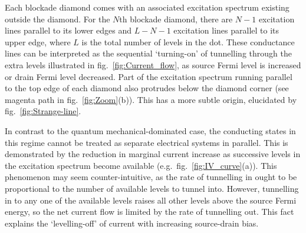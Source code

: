 \documentclass[a4paper,11pt]{article}
\begin{document}
    Each blockade diamond comes with an associated excitation spectrum existing outside the diamond. For the $N$th blockade diamond, there are $N-1$ excitation lines parallel to its lower edges and $L - N - 1$ excitation lines parallel to its upper edge, where $L$ is the total number of levels in the dot. These conductance lines can be interpreted as the sequential `turning-on' of tunnelling through the extra levels illustrated in fig.~\ref{fig:Current_flow}, as source Fermi level is increased or drain Fermi level decreased. Part of the excitation spectrum running parallel to the top edge of each diamond also protrudes below the diamond corner (see magenta path in fig.~\ref{fig:Zoom}(b)). This has a more subtle origin, elucidated by fig.~\ref{fig:Strange-line}.

    In contrast to the quantum mechanical-dominated case, the conducting states in this regime cannot be treated as separate electrical systems in parallel. This is demonstrated by the reduction in marginal current increase as successive levels in the excitation spectrum become available (e.g.\ fig.~\ref{fig:IV_curve}(a)). This phenomenon may seem counter-intuitive, as the rate of tunnelling in ought to be proportional to the number of available levels to tunnel into. However, tunnelling in to any one of the available levels raises all other levels above the source Fermi energy, so the net current flow is limited by the rate of tunnelling out. This fact explains the `levelling-off' of current with increasing source-drain bias.
\end{document}
